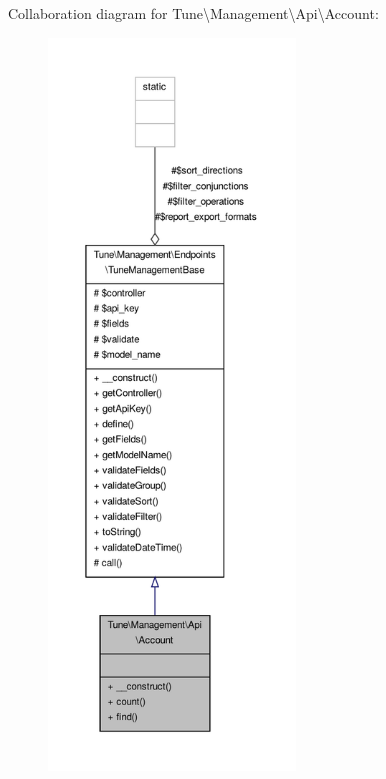 Collaboration diagram for Tune\textbackslash{}Management\textbackslash{}Api\textbackslash{}Account\-:
\nopagebreak
\begin{figure}[H]
\begin{center}
\leavevmode
\includegraphics[height=550pt]{classTune_1_1Management_1_1Api_1_1Account__coll__graph}
\end{center}
\end{figure}
